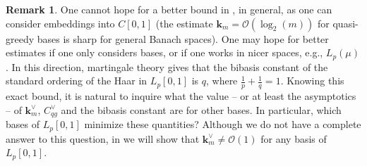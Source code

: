\documentclass[12pt,leqno]{amsart}
\numberwithin{equation}{section}
\theoremstyle{definition}
\newtheorem{remark}[theorem]{Remark}
\newtheorem{question}[theorem]{Question}
\begin{document}
\begin{remark}
One cannot hope for a better bound in , in general, as one can consider embeddings into $C[0,1]$ (the estimate $\textbf{k}_m=\mathcal{O}(\log_2(m))$ for quasi-greedy bases is sharp for general Banach spaces). One may hope for better estimates if one only considers bases, or if one works in nicer spaces, e.g., $L_p(\mu)$. In this direction, martingale theory gives that the bibasis constant of the standard ordering of the Haar in $L_p[0,1]$ is $q$, where $\frac{1}{p}+\frac{1}{q}=1$. Knowing this exact bound, it is natural to inquire what the value -- or at least the asymptotics -- of $\textbf{k}_m^\vee$, $C_{qg}^\vee$  and the bibasis constant are for other bases. In particular, which bases of $L_p[0,1]$ minimize these quantities? Although we do not have a complete answer to this question, in  we will show that $\textbf{k}_m^\vee\neq \mathcal{O}(1)$ for any basis of $L_p[0,1]$.
\end{remark}

\end{document}
